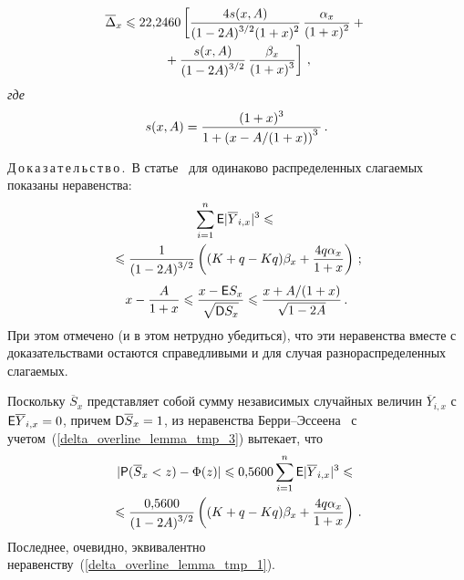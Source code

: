 \begin{multicols}{2}
\vspace*{-12pt}

\noindent
\begin{multline} 
\label{delta_overline_lemma_tmp_2}
\overline{\Delta}_x\leqslant 22{,}2460
\left[
 \displaystyle\frac{\displaystyle 4  s(x,A)\mathstrut}{\displaystyle (1-2A)^{3/2} (1+x)^2\mathstrut}\,
 \displaystyle\frac{\displaystyle \alpha_x\mathstrut}{\displaystyle (1+x)^2\mathstrut}+{}\right.\\
\left. {}+\displaystyle\frac{\displaystyle s(x,A)\mathstrut}{\displaystyle (1-2A)^{3/2}\mathstrut}\, \displaystyle\frac{\displaystyle \beta_x\mathstrut}{\displaystyle (1+x)^3\mathstrut}
 \right]\,,
\end{multline}
\textit{где}
\begin{equation} 
\label{s(x,A)}
s(x,A)=\displaystyle\frac{\displaystyle (1+x)^3\mathstrut}{\displaystyle 1+\left(x-{A}/(1+x)\right)^3\mathstrut}\,.
\end{equation}


\smallskip

\noindent
Д\,о\,к\,а\,з\,а\,т\,е\,л\,ь\,с\,т\,в\,о\,.\  В статье~\cite{KP2011_Neam} 
для одинаково распределенных слагаемых показаны неравенства:
\begin{multline} 
\label{delta_overline_lemma_tmp_3}
\sum\limits_{i=1}^n{\sf E} |\overline{Y}_{i,x}|^3 \leqslant {}\\
{}\leqslant
\displaystyle\frac{\displaystyle 1\mathstrut}{\displaystyle (1-2A)^{3/2}\mathstrut}\left((K+q-Kq)\beta_x+\displaystyle\frac{\displaystyle 4q\alpha_x\mathstrut}{\displaystyle 1+x\mathstrut}\right)\,;
\end{multline}
\begin{equation} 
\label{delta_overline_lemma_tmp_5}
    x-\displaystyle\frac{\displaystyle A\mathstrut}{\displaystyle 1+x\mathstrut}\leqslant
    \displaystyle\frac{\displaystyle x-{\sf E} S_x\mathstrut}{\displaystyle \sqrt{{\sf D} S_x}\mathstrut}\leqslant
    \displaystyle\frac{\displaystyle x+{A}/(1+x)\mathstrut}{\displaystyle \sqrt{1-2A}\mathstrut}\,.
\end{equation}
При этом отмечено (и в этом нетрудно убедиться), что эти
неравенства вместе с доказательствами остаются справедливыми и для
случая разнораспределенных слагаемых.

Поскольку $\overline{S}_x$ представляет собой сумму независимых
случайных величин $\overline{Y}_{i,x}$ с ${\sf E}
\overline{Y}_{i,x}=0$, причем ${\sf D}\overline{S}_{x}=1$, из
неравенства Бер\-ри--Эс\-се\-ена~\cite{Sh2010} с учетом~(\ref{delta_overline_lemma_tmp_3}) 
вытекает, что
\begin{multline*}
|{\sf P}(\overline{S}_x<z)-\Phi(z)|\leqslant
0{,}5600\sum\limits_{i=1}^n{\sf E}|\overline{Y}_{i,x}|^3\leqslant{}\\
{}\leqslant
\displaystyle\frac{\displaystyle 0{,}5600\mathstrut}{\displaystyle (1-2A)^{3/2}\mathstrut}\left((K+q-Kq)\beta_x+\displaystyle\frac{\displaystyle 4q\alpha_x\mathstrut}{\displaystyle 1+x\mathstrut}\right)\,.
\end{multline*}
Последнее, очевидно, эквивалентно неравенству~(\ref{delta_overline_lemma_tmp_1}).


\end{multicols}
